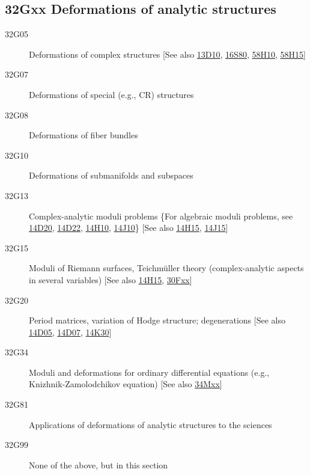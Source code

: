 \subsection*{32Gxx  Deformations of analytic structures }\label{32Gxx}
\begin{description}  
\item [32G05]\label{32G05} Deformations of complex structures [See also \hyperref[13D10]{13D10}, \hyperref[16S80]{16S80}, \hyperref[58H10]{58H10}, \hyperref[58H15]{58H15}]
\item [32G07]\label{32G07} Deformations of special (e.g., CR) structures
\item [32G08]\label{32G08} Deformations of fiber bundles
\item [32G10]\label{32G10} Deformations of submanifolds and subspaces
\item [32G13]\label{32G13} Complex-analytic moduli problems \{For algebraic moduli problems, see \hyperref[14D20]{14D20}, \hyperref[14D22]{14D22}, \hyperref[14H10]{14H10}, \hyperref[14J10]{14J10}\} [See also \hyperref[14H15]{14H15}, \hyperref[14J15]{14J15}]
\item [32G15]\label{32G15} Moduli of Riemann surfaces, Teichm\"{u}ller theory (complex-analytic aspects in several variables) [See also \hyperref[14H15]{14H15}, \hyperref[30Fxx]{30Fxx}]
\item [32G20]\label{32G20} Period matrices, variation of Hodge structure; degenerations [See also \hyperref[14D05]{14D05}, \hyperref[14D07]{14D07}, \hyperref[14K30]{14K30}]
\item [32G34]\label{32G34} Moduli and deformations for ordinary differential equations (e.g., Knizhnik-Zamolodchikov equation) [See also \hyperref[34Mxx]{34Mxx}]
\item [32G81]\label{32G81} Applications of deformations of analytic structures to the sciences
\item [32G99]\label{32G99} None of the above, but in this section
\end{description}
